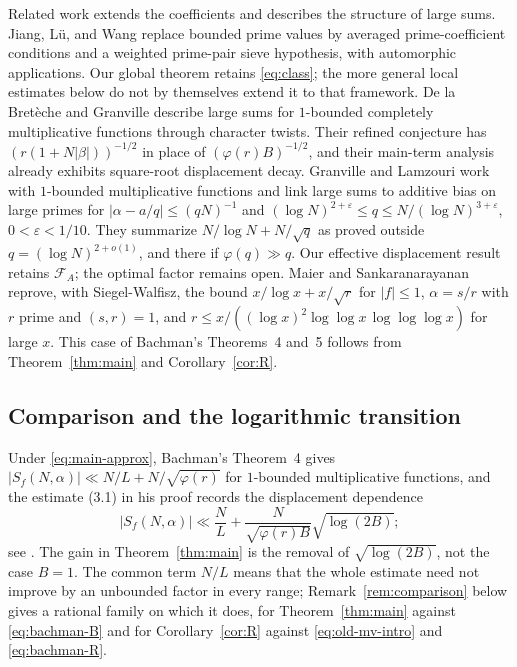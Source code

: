 \documentclass[11pt]{amsart}
\numberwithin{equation}{section}
\numberwithin{figure}{section}
\theoremstyle{definition}
\newcommand{\FA}{\mathcal F_A}
\newcommand{\eps}{\varepsilon}
\begin{document}
Related work extends the coefficients and describes the structure of
large sums. Jiang, L\"u, and Wang \cite[conditions (C.1)-(C.3) and
Theorem~1.1]{JLW} replace bounded prime values by averaged
prime-coefficient conditions and a weighted prime-pair sieve hypothesis,
with automorphic applications. Our global theorem retains
\eqref{eq:class}; the more general local estimates below do not by
themselves extend it to that framework.
De la Bret\`eche and Granville \cite[Theorem~4 and Section~10.1]{dBG}
describe large sums for $1$-bounded completely multiplicative functions
through character twists. Their refined conjecture
\cite[equation~(1.4)]{dBG} has $(r(1+N|\beta|))^{-1/2}$ in place of
$(\varphi(r)B)^{-1/2}$, and their main-term analysis already exhibits
square-root displacement decay.
Granville and Lamzouri \cite[Theorem~1.1, Corollary~1.1, Section~1.4]{GL}
work with $1$-bounded multiplicative functions and link large sums to
additive bias on large primes for $|\alpha-a/q|\le(qN)^{-1}$ and
$(\log N)^{2+\eps}\le q\le N/(\log N)^{3+\eps}$, $0<\eps<1/10$.
They summarize $N/\log N+N/\sqrt q$ as proved outside
$q=(\log N)^{2+o(1)}$, and there if $\varphi(q)\gg q$. Our effective
displacement result retains $\FA$; the optimal factor remains open.
Maier and Sankaranarayanan \cite[Theorem~1.2]{MS05} reprove, with
Siegel-Walfisz, the bound $x/\log x+x/\sqrt r$ for $|f|\le1$,
$\alpha=s/r$ with $r$ prime and $(s,r)=1$, and
$r\le x/((\log x)^2\log\log x\,\log\log\log x)$ for large $x$.
This case of Bachman's Theorems~4 and~5 follows from
Theorem~\ref{thm:main} and Corollary~\ref{cor:R}.

\subsection{Comparison and the logarithmic transition}

Under \eqref{eq:main-approx}, Bachman's Theorem~4 gives
$|S_f(N,\alpha)|\ll N/L+N/\sqrt{\varphi(r)}$ for $1$-bounded
multiplicative functions, and the estimate (3.1) in his proof records
the displacement dependence
\begin{equation}\label{eq:bachman-B}
 |S_f(N,\alpha)|\ll \frac{N}{L}
   +\frac{N}{\sqrt{\varphi(r)B}}\sqrt{\log(2B)};
\end{equation}
see \cite[Theorem~4 and equation~(3.1)]{Bachman}. The gain in
Theorem~\ref{thm:main} is the removal of $\sqrt{\log(2B)}$, not the
case $B=1$. The common term $N/L$ means that the whole estimate need
not improve by an unbounded factor in every range;
Remark~\ref{rem:comparison} below gives a rational family on which it
does, for Theorem~\ref{thm:main} against \eqref{eq:bachman-B} and for
Corollary~\ref{cor:R} against \eqref{eq:old-mv-intro} and
\eqref{eq:bachman-R}.
\end{document}
